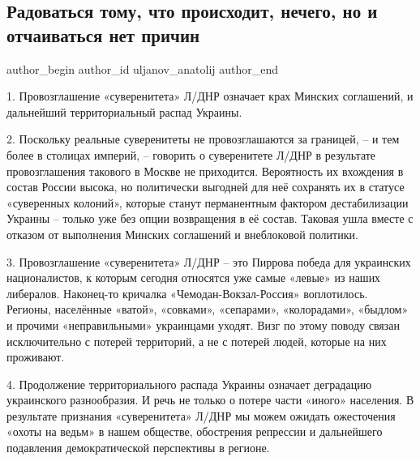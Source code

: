  
 
 
 
 
 
\subsection{Радоваться тому, что происходит, нечего, но и отчаиваться нет причин}
\label{sec:21_02_2022.fb.uljanov_anatolij.1.ldnr}
 
\ifcmt
 author_begin
   author_id uljanov_anatolij
 author_end
\fi

1. Провозглашение «суверенитета» Л/ДНР означает крах Минских соглашений, и
дальнейший территориальный распад Украины. 


2. Поскольку реальные суверенитеты не провозглашаются за границей, – и тем
более в столицах империй, – говорить о суверенитете Л/ДНР в результате
провозглашения такового в Москве не приходится. Вероятность их вхождения в
состав России высока, но политически выгодней для неё сохранять их в статусе
«суверенных колоний», которые станут перманентным фактором дестабилизации
Украины – только уже без опции возвращения в её состав. Таковая ушла вместе с
отказом от выполнения Минских соглашений и внеблоковой политики. 

3. Провозглашение «суверенитета» Л/ДНР – это Пиррова победа для украинских
националистов, к которым сегодня относятся уже самые «левые» из наших
либералов. Наконец-то кричалка «Чемодан-Вокзал-Россия» воплотилось. Регионы,
населённые «ватой», «совками», «сепарами», «колорадами», «быдлом» и прочими
«неправильными» украинцами уходят. Визг по этому поводу связан исключительно с
потерей территорий, а не с потерей людей, которые на них проживают.

4. Продолжение территориального распада Украины означает деградацию украинского
разнообразия. И речь не только о потере части «иного» населения. В результате
признания «суверенитета» Л/ДНР мы можем ожидать ожесточения «охоты на ведьм» в
нашем обществе, обострения репрессии и дальнейшего подавления демократической
перспективы в регионе.          

